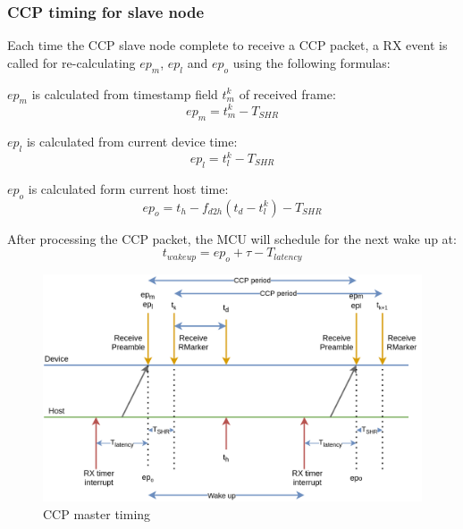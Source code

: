 \documentclass[\main/thesis.tex]{subfiles}
\begin{document}
\subsubsection{CCP timing for slave node}

Each time the CCP slave node complete to receive a CCP packet, a RX event is called for re-calculating $ep_m$, $ep_l$ and $ep_o$ using the following formulas:

$ep_m$ is calculated from timestamp field $t^k_m$ of received frame:
\begin{equation}
    ep_m = t^k_m - T_{SHR}
\end{equation}

$ep_l$ is calculated from current device time:
\begin{equation}
ep_l = t^k_l - T_{SHR}
\end{equation}

$ep_o$ is calculated form current host time:
\begin{equation}
    ep_o = t_h - f_{d2h}(t_d - t^k_l) - T_{SHR}
\end{equation}

After processing the CCP packet, the MCU will schedule for the next wake up at:
\begin{equation}
    t_{wake up} = ep_o + \tau - T_{latency}
\end{equation}

\begin{figure}[H]
    \begin{center}
        \includegraphics[width=1\textwidth]{ccp_timing_for_slave_node.png}
    \end{center}
    \caption{CCP master timing}
    \label{fig:ccp_timing_for_slave_node}
\end{figure}
\end{document}
